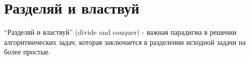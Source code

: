 \section{Разделяй и властвуй}
\label{addDivideAndConquer}
``Разделяй и властвуй'' (divide and conquer) - важная парадигма в
решении алгоритмических задач, которая заключается в разделении
исходной задачи на более простые.
